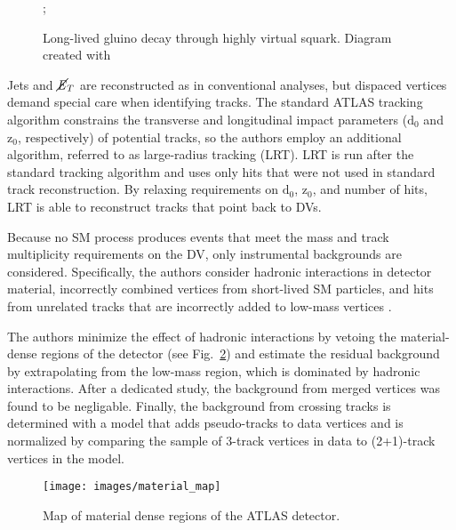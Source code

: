 \documentclass[12pt]{article}
\begin{document}
        \noindent \begin{figure}[htbp] \begin{center}
        ;
        \caption{Long-lived gluino decay through highly virtual squark. Diagram created with~\cite{tikz}}
        \label{displaced_process}
        \end{center} \end{figure}

        Jets and $\cancel{\it{E}}_{T}$ are reconstructed as in conventional analyses, but dispaced vertices demand special care when identifying tracks. The standard ATLAS tracking algorithm constrains the transverse and longitudinal impact parameters ($\mathrm{d}_0$ and $\mathrm{z}_0$, respectively) of potential tracks, so the authors employ an additional algorithm, referred to as large-radius tracking (LRT). LRT is run after the standard tracking algorithm and uses only hits that were not used in standard track reconstruction. By relaxing requirements on $\mathrm{d}_0$, $\mathrm{z}_0$, and number of hits, LRT is able to reconstruct tracks that point back to DVs.
        
        Because no SM process produces events that meet the mass and track multiplicity requirements on the DV, only instrumental backgrounds are considered. Specifically, the authors consider hadronic interactions in detector material, incorrectly combined vertices from short-lived SM particles, and hits from unrelated tracks that are incorrectly added to low-mass vertices .

        The authors minimize the effect of hadronic interactions by vetoing the material-dense regions of the detector (see Fig.~\ref{material_map}) and estimate the residual background by extrapolating from the low-mass region, which is dominated by hadronic interactions. After a dedicated study, the background from merged vertices was found to be negligable. Finally, the background from crossing tracks is determined with a model that adds pseudo-tracks to data vertices and is normalized by comparing the sample of 3-track vertices in data to (2+1)-track vertices in the model.

        \noindent \begin{figure}[htbp] \begin{center}
        \texttt{[image: images/material\_map]}
            \caption{Map of material dense regions of the ATLAS detector.~\cite{atlas_displaced}}
        \label{material_map}
        \end{center} \end{figure}
\end{document}
